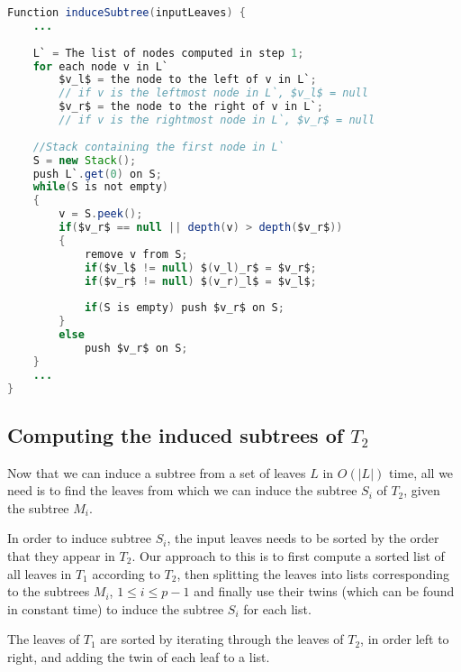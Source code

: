 \begin{lstlisting}[language=Java, caption=Step 2 of induceSubtree, label={lst:induceSubtreeCode}, mathescape]
Function induceSubtree(inputLeaves) {
	...
	
	L` = The list of nodes computed in step 1;
	for each node v in L`
		$v_l$ = the node to the left of v in L`;
		// if v is the leftmost node in L`, $v_l$ = null
		$v_r$ = the node to the right of v in L`;
		// if v is the rightmost node in L`, $v_r$ = null
		
	//Stack containing the first node in L`	
	S = new Stack();
	push L`.get(0) on S;
	while(S is not empty)
	{
		v = S.peek();
		if($v_r$ == null || depth(v) > depth($v_r$))
		{
			remove v from S;
			if($v_l$ != null) $(v_l)_r$ = $v_r$;
			if($v_r$ != null) $(v_r)_l$ = $v_l$;
			
			if(S is empty) push $v_r$ on S;
		}
		else
			push $v_r$ on S;
	}
	...
}
\end{lstlisting}

\subsection{Computing the induced subtrees of $T_2$}
Now that we can induce a subtree from a set of leaves $L$ in $O(|L|)$ time, all we need is to find the leaves from which we can induce the subtree $S_i$ of $T_2$, given the subtree $M_i$.

In order to induce subtree $S_i$, the input leaves needs to be sorted by the order that they appear in $T_2$. Our approach to this is to first compute a sorted list of all leaves in $T_1$ according to $T_2$, then splitting the leaves into lists corresponding to the subtrees $M_i$, $1 \le i \le p-1$ and finally use their twins (which can be found in constant time) to induce the subtree $S_i$ for each list.

The leaves of $T_1$ are sorted by iterating through the leaves of $T_2$, in order left to right, and adding the twin of each leaf to a list.



